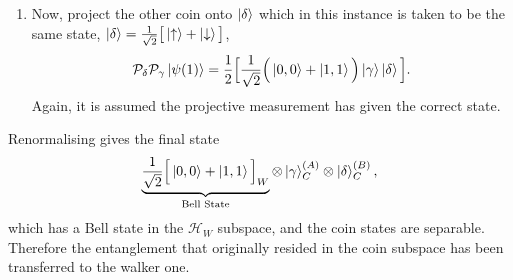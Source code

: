 \begin{enumerate}
    \item Now, project the other coin onto $\ket{\delta}$ which in this instance is taken to be the same state, $\ket{\delta} = \frac{1}{\sqrt{2}} \big [\ket{\uparrow} + \ket{\downarrow} \big]$,
    \begin{equation}
        \mathcal{P}_\delta \mathcal{P}_\gamma \ket{\psi(1)} = \frac{1}{2}\Big [\frac{1}{\sqrt{2}}\Big (\ket{0, 0} + \ket{1, 1}\Big )\ket{\gamma}\ket{\delta}\Big].
    \end{equation}
    Again, it is assumed the projective measurement has given the correct state.
\end{enumerate}
Renormalising gives the final state
\begin{equation}
    \label{equation:qw_transfer_1_final}
    \underbrace{\frac{1}{\sqrt{2}}\Big [\ket{0, 0} + \ket{1, 1}\Big ]_W}_{\text{Bell State}}\otimes \ket{\gamma}^{(A)}_C \otimes \ket{\delta}^{(B)}_C,
\end{equation}
which has a Bell state in the $\mathcal{H}_W$ subspace, and the coin states are separable.
Therefore the entanglement that originally resided in the coin subspace has been transferred to the walker one.

